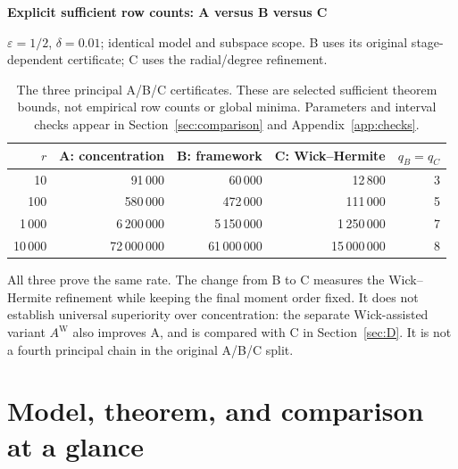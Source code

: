 \documentclass[11pt]{article}
\numberwithin{equation}{section}
\theoremstyle{definition}\newtheorem{definition}[theorem]{Definition}
\theoremstyle{remark}\newtheorem{remark}[theorem]{Remark}
\begin{document}
\vspace{3mm}
{\sffamily\bfseries\color{Navy}Explicit sufficient row counts: A versus B versus C\par}
{\small $\varepsilon=1/2$, $\delta=0.01$; identical model and subspace scope.
B uses its original stage-dependent certificate; C uses the radial/degree refinement.}
\begin{table}[H]\centering\small
\setlength{\tabcolsep}{10pt}\renewcommand{\arraystretch}{1.18}
\begin{tabular}{@{}rrrrr@{}}
\toprule
$r$&\textbf{A: concentration}&\textbf{B: framework}&\textbf{C: Wick--Hermite}&$q_B=q_C$\\
\midrule
10&91\,000&60\,000&12\,800&3\\
100&580\,000&472\,000&111\,000&5\\
1\,000&6\,200\,000&5\,150\,000&1\,250\,000&7\\
10\,000&72\,000\,000&61\,000\,000&15\,000\,000&8\\
\bottomrule
\end{tabular}
\caption{The three principal A/B/C certificates. These are selected sufficient theorem bounds,
not empirical row counts or global minima. Parameters and interval checks appear in
Section~\ref{sec:comparison} and Appendix~\ref{app:checks}.}
\label{tab:three-main-counts}
\end{table}

\begin{takeaway}[title={What this comparison means},top=5pt,bottom=5pt]
\small
All three prove the same rate. The change from B to C measures the Wick--Hermite
refinement while keeping the final moment order fixed. It does not establish
universal superiority over concentration: the separate Wick-assisted variant
$A^{\mathrm W}$ also improves A, and is compared with C in
Section~\ref{sec:D}. It is not a fourth principal chain in the original A/B/C split.
\end{takeaway}
\clearpage
\section{Model, theorem, and comparison at a glance}\label{sec:model}
\end{document}
